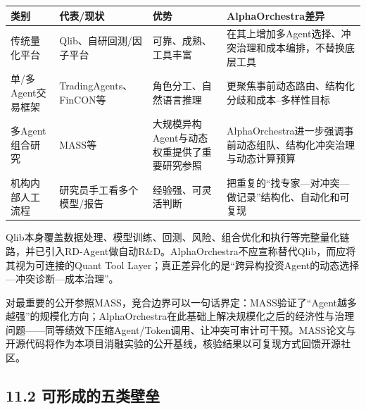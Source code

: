 \documentclass[12pt,a4paper]{ctexart}
\begin{document}
\begin{longtable}[]{@{}
  >{\raggedright\arraybackslash}p{}
  >{\raggedright\arraybackslash}p{}
  >{\raggedright\arraybackslash}p{}
  >{\raggedright\arraybackslash}p{}@{}}
\toprule\noalign{}
\begin{minipage}[b]{\linewidth}\centering
\textbf{类别}
\end{minipage} & \begin{minipage}[b]{\linewidth}\centering
\textbf{代表/现状}
\end{minipage} & \begin{minipage}[b]{\linewidth}\centering
\textbf{优势}
\end{minipage} & \begin{minipage}[b]{\linewidth}\centering
\textbf{AlphaOrchestra差异}
\end{minipage} \\
\midrule\noalign{}
\endhead
\bottomrule\noalign{}
\endlastfoot
传统量化平台 & Qlib、自研回测/因子平台 & 可靠、成熟、工具丰富 &
在其上增加多Agent选择、冲突治理和成本编排，不替换底层工具 \\
单/多Agent交易框架 & TradingAgents、FinCON等 & 角色分工、自然语言推理 &
更聚焦事前动态路由、结构化分歧和成本--多样性目标 \\
多Agent组合研究 & MASS等 & 大规模异构Agent与动态权重提供了重要研究参照 &
AlphaOrchestra进一步强调事前动态组队、结构化冲突治理与动态计算预算 \\
机构内部人工流程 & 研究员手工看多个模型/报告 & 经验强、可灵活判断 &
把重复的``找专家---对冲突---做记录''结构化、自动化和可复现 \\
\end{longtable}

Qlib本身覆盖数据处理、模型训练、回测、风险、组合优化和执行等完整量化链路，并已引入RD-Agent做自动R\&D。AlphaOrchestra不应宣称替代Qlib，而应将其视为可连接的Quant
Tool
Layer；真正差异化的是``跨异构投资Agent的动态选择---冲突诊断---成本治理''。

对最重要的公开参照MASS，竞合边界可以一句话界定：MASS验证了``Agent越多越强''的规模化方向；AlphaOrchestra在此基础上解决规模化之后的经济性与治理问题------同等绩效下压缩Agent/Token调用、让冲突可审计可干预。MASS论文与开源代码将作为本项目消融实验的公开基线，核验结果以可复现方式回馈开源社区。

\subsection{\texorpdfstring{\textbf{11.2
可形成的五类壁垒}}{11.2 可形成的五类壁垒}}\label{ux53efux5f62ux6210ux7684ux4e94ux7c7bux58c1ux5792}
\end{document}
